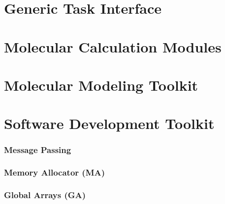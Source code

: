 \chapter{Generic Task Interface}


\chapter{Molecular Calculation Modules}


\chapter{Molecular Modeling Toolkit}




 

\chapter{Software Development Toolkit}

\subsection{Message Passing}

\subsection{Memory Allocator (MA)}

\subsection{Global Arrays (GA)}

